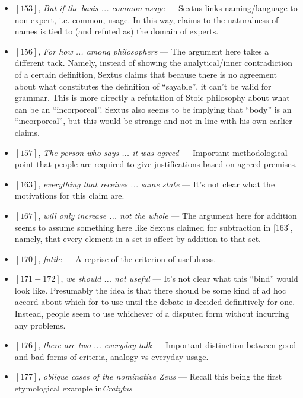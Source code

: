 \documentclass[12pt]{article}
\begin{document}
\begin{itemize}
\item $[153]$, \textit{But if the basis ... common usage} --- \ul{Sextus links naming/language to non-expert, i.e. common, usage}. In this way, claims to the naturalness of names is tied to (and refuted as) the domain of experts.

\item $[156]$, \textit{For how ... among philosophers} --- The argument here takes a different tack. Namely, instead of showing the analytical/inner contradiction of a certain definition, Sextus claims that because there is no agreement about what constitutes the definition of ``sayable'', it can't be valid for grammar. This is more directly a refutation of Stoic philosophy about what can be an ``incorporeal''. Sextus also seems to be implying that ``body'' is an ``incorporeal'', but this would be strange and not in line with his own earlier claims.

\item $[157]$, \textit{The person who says ... it was agreed} --- \ul{Important methodological point that people are required to give justifications based on agreed premises.}

\item $[163]$, \textit{everything that receives ... same state} --- It's not clear what the motivations for this claim are.

\item $[167]$, \textit{will only increase ... not the whole} --- The argument here for addition  seems to assume something here like Sextus claimed for subtraction in [163], namely, that every element in a set is affect by addition to that set.

\item $[170]$, \textit{futile} --- A reprise of the criterion of usefulness.

\item $[171-172]$, \textit{we should ... not useful} --- It's not clear what this ``bind'' would look like. Presumably the idea is that there should be some kind of ad hoc accord about which for to use until the debate is decided definitively for one. Instead, people seem to use whichever of a disputed form without incurring any problems.

\item $[176]$, \textit{there are two ... everyday talk} --- \ul{Important distinction between good and bad forms of criteria, analogy vs everyday usage.}

\item $[177]$, \textit{oblique cases of the nominative Zeus} --- Recall this being the first etymological example in\textit{Cratylus}


\end{itemize}
\end{document}
